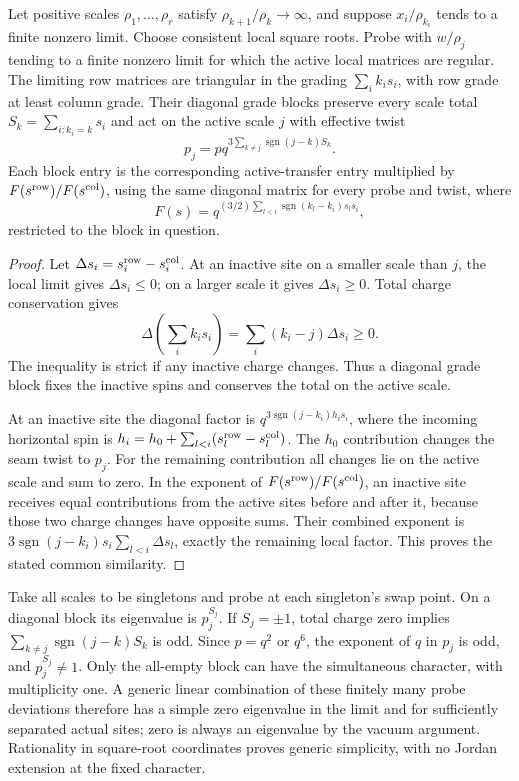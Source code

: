 \begin{lemma}\label{j:separated-scales}
Let positive scales $\rho_1,\ldots,\rho_r$ satisfy
$\rho_{k+1}/\rho_k\to\infty$, and suppose
$x_i/\rho_{k_i}$ tends to a finite nonzero limit. Choose consistent
local square roots. Probe with $w/\rho_j$ tending to a finite nonzero
limit for which the active local matrices are regular. The limiting
row matrices are triangular in the grading $\sum_i k_i s_i$, with row
grade at least column grade. Their diagonal grade blocks preserve every
scale total $S_k=\sum_{i:k_i=k}s_i$ and act on the active scale $j$
with effective twist
\[
p_j=p q^{3\sum_{k\ne j}\operatorname{sgn}(j-k) S_k} .
\]
Each block entry is the corresponding active-transfer entry multiplied
by $F(s^{\rm row})/F(s^{\rm col})$, using the same diagonal matrix
for every probe and twist, where
\[
F(s)=q^{(3/2)\sum_{l<i}\operatorname{sgn}(k_l-k_i)s_l s_i} ,
\]
restricted to the block in question.
\end{lemma}
\begin{proof}
Let $\Delta s_i=s_i^{\rm row}-s_i^{\rm col}$. At an inactive site on a
smaller scale than $j$, the local limit gives $\Delta s_i\le0$; on a
larger scale it gives $\Delta s_i\ge0$. Total charge conservation gives
\[
\Delta\!\left(\sum_i k_i s_i\right)
 =\sum_i(k_i-j)\Delta s_i\ge0.
\]
The inequality is strict if any inactive charge changes. Thus a
diagonal grade block fixes the inactive spins and conserves the total
on the active scale.

At an inactive site the diagonal factor is
$q^{3\operatorname{sgn}(j-k_i)h_i s_i}$, where the incoming horizontal
spin is
$h_i=h_0+\sum_{l<i}(s_l^{\rm row}-s_l^{\rm col})$.
The $h_0$ contribution changes the seam twist to $p_j$. For the
remaining contribution all changes lie on the active scale and sum
to zero. In the exponent of $F(s^{\rm row})/F(s^{\rm col})$, an
inactive site receives equal contributions from the active sites
before and after it, because those two charge changes have opposite
sums. Their combined exponent is
$3\operatorname{sgn}(j-k_i)s_i\sum_{l<i}\Delta s_l$, exactly the
remaining local factor. This proves the stated common similarity.
\end{proof}

Take all scales to be singletons and probe at each singleton's swap
point. On a diagonal block its eigenvalue is $p_j^{S_j}$. If
$S_j=\pm1$, total charge zero implies
$\sum_{k\ne j}\operatorname{sgn}(j-k)S_k$ is odd. Since
$p=q^{2}$ or $q^{6}$, the exponent of $q$ in $p_j$ is odd, and
$p_j^{S_j}\ne1$. Only the all-empty block can have the simultaneous
character, with multiplicity one. A generic linear combination of
these finitely many probe deviations therefore has a simple zero
eigenvalue in the limit and for sufficiently separated actual sites;
zero is always an eigenvalue by the vacuum argument. Rationality in
square-root coordinates proves generic simplicity, with no Jordan
extension at the fixed character.

